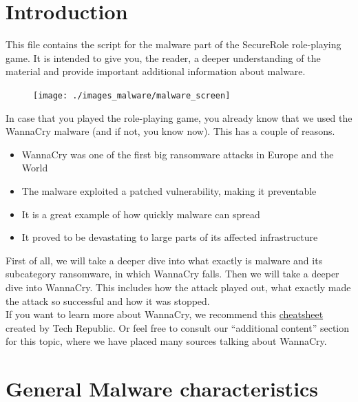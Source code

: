 \chapter{Introduction}

This file contains the script for the malware part of the SecureRole role-playing game.
It is intended to give you, the reader, a deeper understanding of the material and provide important additional information about malware.
\\

\begin{figure}[h!p]
    \centering
    \texttt{[image: ./images\_malware/malware\_screen]}
    \label{img:malware_screen}
\end{figure}

In case that you played the role-playing game, you already know that we used the WannaCry malware (and if not, you know now).
This has a couple of reasons.

\begin{itemize}
    \item WannaCry was one of the first big ransomware attacks in Europe and the World%
    \item The malware exploited a patched vulnerability, making it preventable
    \item It is a great example of how quickly malware can spread
    \item It proved to be devastating to large parts of its affected infrastructure
\end{itemize}

First of all, we will take a deeper dive into what exactly is malware and its subcategory ransomware, in which WannaCry falls.
Then we will take a deeper dive into WannaCry.
This includes how the attack played out, what exactly made the attack so successful and how it was stopped.
\\

If you want to learn more about WannaCry, we recommend this \href{https://www.techrepublic.com/article/wannacry-the-smart-persons-guide/}{cheatsheet} created by Tech Republic.
Or feel free to consult our \enquote{additional content} section for this topic, where we have placed many sources talking about WannaCry.
\\


\chapter{General Malware characteristics}

